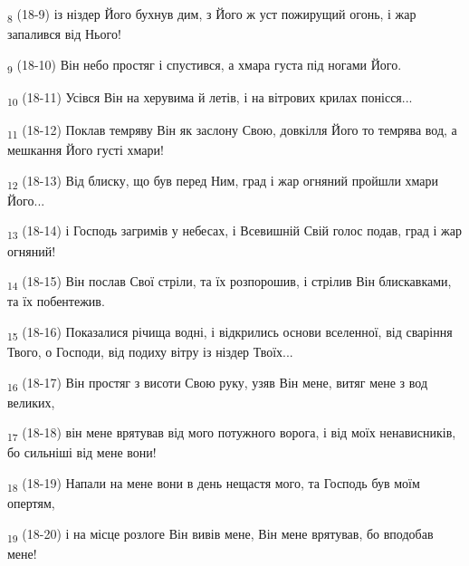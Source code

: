\begin{tcolorbox}
\textsubscript{8} (18-9) із ніздер Його бухнув дим, з Його ж уст пожирущий огонь, і жар запалився від Нього!
\end{tcolorbox}
\begin{tcolorbox}
\textsubscript{9} (18-10) Він небо простяг і спустився, а хмара густа під ногами Його.
\end{tcolorbox}
\begin{tcolorbox}
\textsubscript{10} (18-11) Усівся Він на херувима й летів, і на вітрових крилах понісся...
\end{tcolorbox}
\begin{tcolorbox}
\textsubscript{11} (18-12) Поклав темряву Він як заслону Свою, довкілля Його то темрява вод, а мешкання Його густі хмари!
\end{tcolorbox}
\begin{tcolorbox}
\textsubscript{12} (18-13) Від блиску, що був перед Ним, град і жар огняний пройшли хмари Його...
\end{tcolorbox}
\begin{tcolorbox}
\textsubscript{13} (18-14) і Господь загримів у небесах, і Всевишній Свій голос подав, град і жар огняний!
\end{tcolorbox}
\begin{tcolorbox}
\textsubscript{14} (18-15) Він послав Свої стріли, та їх розпорошив, і стрілив Він блискавками, та їх побентежив.
\end{tcolorbox}
\begin{tcolorbox}
\textsubscript{15} (18-16) Показалися річища водні, і відкрились основи вселенної, від сваріння Твого, о Господи, від подиху вітру із ніздер Твоїх...
\end{tcolorbox}
\begin{tcolorbox}
\textsubscript{16} (18-17) Він простяг з висоти Свою руку, узяв Він мене, витяг мене з вод великих,
\end{tcolorbox}
\begin{tcolorbox}
\textsubscript{17} (18-18) він мене врятував від мого потужного ворога, і від моїх ненависників, бо сильніші від мене вони!
\end{tcolorbox}
\begin{tcolorbox}
\textsubscript{18} (18-19) Напали на мене вони в день нещастя мого, та Господь був моїм опертям,
\end{tcolorbox}
\begin{tcolorbox}
\textsubscript{19} (18-20) і на місце розлоге Він вивів мене, Він мене врятував, бо вподобав мене!
\end{tcolorbox}
